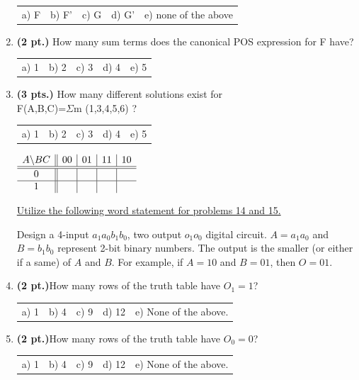 \documentclass{article}
\begin{document}
\begin{enumerate}
\begin{tabular}{p{0.7in} p{0.7in} p{0.7in} p{0.7in} l}
a) F & b) F' & c) G & d) G' & e) none of the above
\end{tabular}

\item {\bf (2 pt.)} How many sum terms does the canonical POS expression 
for F have?

\begin{tabular}{p{0.7in} p{0.7in} p{0.7in} p{0.7in} l}
a) 1 & b) 2 & c) 3 & d) 4 & e) 5
\end{tabular}

\item {\bf (3 pts.)} How many different \SOPmin solutions exist for \\
F(A,B,C)=$\Sigma$m (1,3,4,5,6) ?

\begin{tabular}{p{0.7in} p{0.7in} p{0.7in} p{0.7in} l}
a) 1 & b) 2 & c) 3 & d) 4 & e) 5
\end{tabular}

$ \begin{array} {c||c|c|c|c}
        A \backslash BC & 00 & 01 & 11 & 10 \\ \hline \hline
        0        &    &    &    &    \\ \hline
        1        &    &    &    &    \\ 
\end{array} $


\pagebreak
\underline{Utilize the following word statement for problems 14 and 15.}


Design a 4-input $a_1a_0b_1b_0$, two output $o_1 o_0$ digital circuit.  
$A=a_1a_0$ and $B=b_1b_0$ represent 2-bit binary numbers.  The output 
is the smaller (or either if a same) of $A$ and $B$.  
For example, if $A=10$ and $B=01$, then $O=01$.

\item {\bf (2 pt.)}How many rows of the truth table have $O_1 = 1$?

\begin{tabular}{p{0.7in} p{0.7in} p{0.7in} p{0.7in} l}
a) 1 & b) 4 & c) 9 & d) 12 & e) None of the above.
\end{tabular}

\item {\bf (2 pt.)}How many rows of the truth table have $O_0 = 0$?

\begin{tabular}{p{0.7in} p{0.7in} p{0.7in} p{0.7in} l}
a) 1 & b) 4 & c) 9 & d) 12 & e) None of the above.
\end{tabular}


\end{enumerate}
\end{document}
